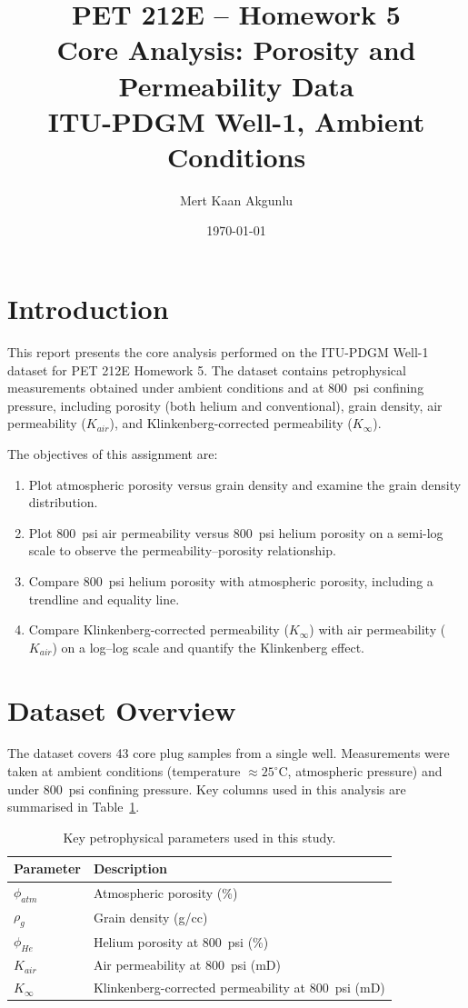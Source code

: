 \documentclass[12pt,a4paper]{article}
\title{PET 212E -- Homework 5\\
\large Core Analysis: Porosity and Permeability Data\\
ITU-PDGM Well-1, Ambient Conditions}
\author{Mert Kaan Akgunlu}
\date{\today}
\begin{document}
\maketitle
\tableofcontents
\newpage

\section{Introduction}
This report presents the core analysis performed on the ITU-PDGM Well-1 dataset for PET 212E Homework 5. The dataset contains petrophysical measurements obtained under ambient conditions and at 800~psi confining pressure, including porosity (both helium and conventional), grain density, air permeability ($K_{air}$), and Klinkenberg-corrected permeability ($K_{\infty}$).

The objectives of this assignment are:
\begin{enumerate}
    \item Plot atmospheric porosity versus grain density and examine the grain density distribution.
    \item Plot 800~psi air permeability versus 800~psi helium porosity on a semi-log scale to observe the permeability--porosity relationship.
    \item Compare 800~psi helium porosity with atmospheric porosity, including a trendline and equality line.
    \item Compare Klinkenberg-corrected permeability ($K_{\infty}$) with air permeability ($K_{air}$) on a log--log scale and quantify the Klinkenberg effect.
\end{enumerate}

\section{Dataset Overview}
The dataset covers 43 core plug samples from a single well. Measurements were taken at ambient conditions (temperature $\approx 25^\circ$C, atmospheric pressure) and under 800~psi confining pressure. Key columns used in this analysis are summarised in Table~\ref{tab:columns}.

\begin{table}[h!]
\centering
\caption{Key petrophysical parameters used in this study.}
\label{tab:columns}
\begin{tabular}{ll}
\toprule
\textbf{Parameter} & \textbf{Description} \\
\midrule
$\phi_{atm}$ & Atmospheric porosity (\%) \\
$\rho_g$     & Grain density (g/cc) \\
$\phi_{He}$  & Helium porosity at 800~psi (\%) \\
$K_{air}$    & Air permeability at 800~psi (mD) \\
$K_{\infty}$ & Klinkenberg-corrected permeability at 800~psi (mD) \\
\bottomrule
\end{tabular}
\end{table}
\end{document}
